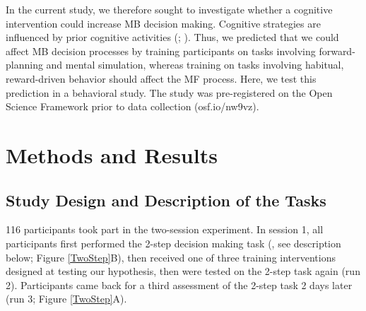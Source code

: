 \documentclass[11pt]{article} %
\begin{document}
In the current study, we therefore sought to investigate whether a cognitive intervention could increase MB decision making. Cognitive strategies are influenced by prior cognitive activities (\cite{jaeggi_short-_2011}; \cite{muraven_self-regulation_2000}). Thus, we predicted that we could affect MB decision processes by training participants on tasks involving forward-planning and mental simulation, whereas training on tasks involving habitual, reward-driven behavior should affect the MF process. Here, we test this prediction in a behavioral study. The study was pre-registered on the Open Science Framework prior to data collection (osf.io/nw9vz).

\section{Methods and Results}
\subsection{Study Design and Description of the Tasks}

116 participants took part in the two-session experiment. In session 1, all participants first performed the 2-step decision making task (\cite{daw_model-based_2011}, see description below; Figure \ref{TwoStep}B), then received one of three training interventions designed at testing our hypothesis, then were tested on the 2-step task again (run 2). Participants came back for a third assessment of the 2-step task 2 days later (run 3; Figure \ref{TwoStep}A).%
\end{document}
